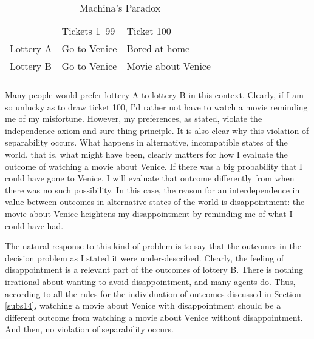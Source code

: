 \begin{table}[ht]
\centering
\begin{tabular}{lllll}
\cline{2-3}
\multicolumn{1}{l|}{}           & \multicolumn{1}{l|}{Tickets 1--99} & \multicolumn{1}{l|}{Ticket 100}         &  &  \\ \cline{1-3}
\multicolumn{1}{|l|}{Lottery A} & \multicolumn{1}{l|}{Go to Venice}   & \multicolumn{1}{l|}{Bored at home}      &  &  \\ \cline{1-3}
\multicolumn{1}{|l|}{Lottery B} & \multicolumn{1}{l|}{Go to Venice}   & \multicolumn{1}{l|}{Movie about Venice} &  &  \\ \cline{1-3}
                                &                                     &                                         &  &
\end{tabular}
\caption{Machina's Paradox}
\label{t5}
\end{table}

Many people would prefer lottery A to lottery B in this context. Clearly, if I am so unlucky as to draw ticket 100, I'd rather not have to watch a movie reminding me of my misfortune. However, my preferences, as stated, violate the independence axiom and sure-thing principle. It is also clear why this violation of separability occurs. What happens in alternative, incompatible states of the world, that is, what might have been, clearly matters for how I evaluate the outcome of watching a movie about Venice. If there was a big probability that I could have gone to Venice, I will evaluate that outcome differently from when there was no such possibility. In this case, the reason for an interdependence in value between outcomes in alternative states of the world is disappointment: the movie about Venice heightens my disappointment by reminding me of what I could have had.

The natural response to this kind of problem is to say that the outcomes in the decision problem as I stated it were under-described. Clearly, the feeling of disappointment is a relevant part of the outcomes of lottery B. There is nothing irrational about wanting to avoid disappointment, and many agents do. Thus, according to all the rules for the individuation of outcomes discussed in Section \ref{subs14}, watching a movie about Venice with disappointment should be a different outcome from watching a movie about Venice without disappointment. And then, no violation of separability occurs.

